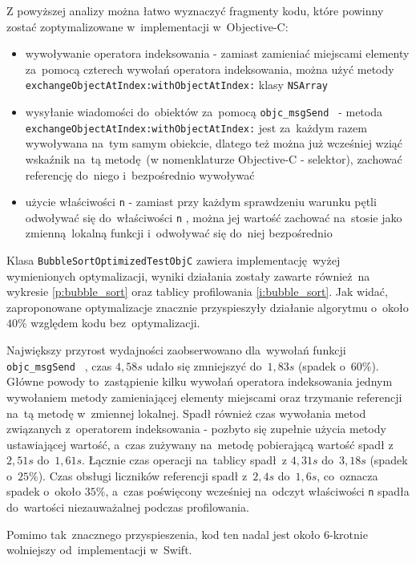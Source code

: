 \documentclass[mgr, shortabstract]{iithesis}
\newcommand{\objcinline}[1]{
    \texttt{#1}
}
\begin{document}
Z powyższej analizy można łatwo wyznaczyć fragmenty kodu, które powinny zostać zoptymalizowane w~implementacji w~Objective-C:

\begin{itemize}
    \item wywoływanie operatora indeksowania - zamiast zamieniać miejscami elementy za~pomocą czterech wywołań operatora indeksowania, można użyć metody \objcinline{exchangeObjectAtIndex:withObjectAtIndex:} klasy \objcinline{NSArray}
    \item wysyłanie wiadomości do~obiektów za~pomocą \objcinline{objc_msgSend } - metoda \objcinline{exchangeObjectAtIndex:withObjectAtIndex:} jest za~każdym razem wywoływana na~tym samym obiekcie, dlatego też można już wcześniej wziąć wskaźnik na~tą metodę (w nomenklaturze Objective-C - selektor), zachować referencję do~niego i~bezpośrednio wywoływać
    \item użycie właściwości \objcinline{n} - zamiast przy każdym sprawdzeniu warunku pętli odwoływać się do~właściwości \objcinline{n}, można jej wartość zachować na~stosie jako zmienną lokalną funkcji i~odwoływać się do~niej bezpośrednio
\end{itemize}

Klasa \objcinline{BubbleSortOptimizedTestObjC} zawiera implementację wyżej wymienionych optymalizacji, wyniki działania zostały zawarte również na wykresie \ref{p:bubble_sort} oraz tablicy profilowania \ref{i:bubble_sort}. Jak widać, zaproponowane optymalizacje znacznie przyspieszyły działanie algorytmu o~około $40\%$ względem kodu bez~optymalizacji.

Największy przyrost wydajności zaobserwowano dla~wywołań funkcji \objcinline{objc_msgSend }, czas $4,58s$ udało się zmniejszyć do~$1,83s$ (spadek o~$60\%$). Główne powody to~zastąpienie kilku wywołań operatora indeksowania jednym wywołaniem metody zamieniającej elementy miejscami oraz trzymanie referencji na~tą metodę w~zmiennej lokalnej. Spadł również czas wywołania metod związanych z~operatorem indeksowania - pozbyto się zupełnie użycia metody ustawiającej wartość, a~czas zużywany na~metodę pobierającą wartość spadł z~$2,51s$ do~$1,61s$. Łącznie czas operacji na~tablicy spadł z $4,31s$ do~$3,18s$ (spadek o~$25\%$). Czas obsługi liczników referencji spadł z~$2,4s$ do~$1,6s$, co~oznacza spadek o~około $35\%$, a~czas poświęcony wcześniej na~odczyt właściwości \objcinline{n} spadła do~wartości niezauważalnej podczas profilowania.

Pomimo tak~znacznego przyspieszenia, kod ten nadal jest około 6-krotnie wolniejszy od~implementacji w~Swift.
\end{document}
